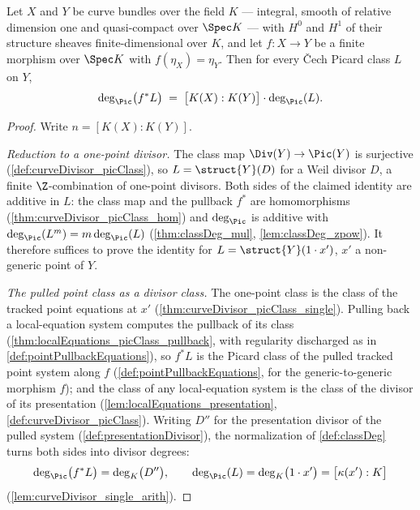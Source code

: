 \begin{theorem}
  \label{thm:classDeg_cechPicMap_eq_finrank_mul}
  \leanok
  Let \(X\) and \(Y\) be curve bundles over the field \(K\) --- integral, smooth of
  relative dimension one and quasi-compact over \(\Spec K\) --- with \(H^0\) and
  \(H^1\) of their structure sheaves finite-dimensional over \(K\), and let
  \(f : X \to Y\) be a finite morphism over \(\Spec K\) with \(f(\eta_X) = \eta_Y\).
  Then for every \v Cech Picard class \(L\) on \(Y\),
  \[
    \deg_{\Pic}\bigl(f^{*}L\bigr)
      \;=\; \bigl[K(X) : K(Y)\bigr] \cdot \deg_{\Pic}(L).
  \]
\end{theorem}
\begin{proof}
  \leanok
  Write \(n = [K(X) : K(Y)]\).

  \emph{Reduction to a one-point divisor.} The class map
  \(\Div(Y) \to \Pic(Y)\) is surjective (\ref{def:curveDivisor_picClass}), so
  \(L = \struct{Y}(D)\) for a Weil divisor \(D\), a finite \(\Z\)-combination of
  one-point divisors. Both sides of the claimed identity are additive in \(L\): the
  class map and the pullback \(f^{*}\) are homomorphisms
  (\ref{thm:curveDivisor_picClass_hom}) and \(\deg_{\Pic}\) is additive with
  \(\deg_{\Pic}(L^m) = m \deg_{\Pic}(L)\) (\ref{thm:classDeg_mul},
  \ref{lem:classDeg_zpow}). It therefore suffices to prove the identity for
  \(L = \struct{Y}(1 \cdot x')\), \(x'\) a non-generic point of \(Y\).

  \emph{The pulled point class as a divisor class.} The one-point class is the class
  of the tracked point equations at \(x'\) (\ref{thm:curveDivisor_picClass_single}).
  Pulling back a local-equation system computes the pullback of its class
  (\ref{thm:localEquations_picClass_pullback}, with regularity discharged as in
  \ref{def:pointPullbackEquations}), so \(f^{*}L\) is the Picard class of the pulled
  tracked point system along \(f\) (\ref{def:pointPullbackEquations}, for the
  generic-to-generic morphism \(f\)); and the class of any local-equation system is
  the class of the divisor of its presentation
  (\ref{lem:localEquations_presentation}, \ref{def:curveDivisor_picClass}). Writing
  \(D''\) for the presentation divisor of the pulled system
  (\ref{def:presentationDivisor}), the normalization of \ref{def:classDeg} turns both
  sides into divisor degrees:
  \[
    \deg_{\Pic}\bigl(f^{*}L\bigr) = \deg_{K}\bigl(D''\bigr), \qquad
    \deg_{\Pic}(L) = \deg_{K}\bigl(1 \cdot x'\bigr) = \bigl[\kappa(x') : K\bigr]
  \]
  (\ref{lem:curveDivisor_single_arith}).


\end{proof}
